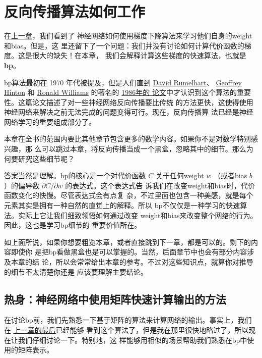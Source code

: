 
\chapter{反向传播算法如何工作}
\label{ch:HowTheBackpropagationAlgorithmWorks}

在\hyperref[ch:UsingNeuralNetsToRecognizeHandwrittenDigits]{上一章}，我们看到了
神经网络如何使用梯度下降算法来学习他们自身的\gls*{weight}和\gls*{bias}。但是，这
里还留下了一个问题：我们并没有讨论如何计算代价函数的梯度。这是很大的缺失！在本章，
我们会解释计算这些梯度的快速算法，也就是\textbf{\gls{bp}}。

\gls*{bp}算法最初在 1970 年代被提及，但是人们直到
\href{http://en.wikipedia.org/wiki/David_Rumelhart}{David Rumelhart}、
\href{http://www.cs.toronto.edu/~hinton/}{Geoffrey Hinton} 和
\href{http://en.wikipedia.org/wiki/Ronald_J._Williams}{Ronald Williams} 的著名的
\href{http://www.nature.com/nature/journal/v323/n6088/pdf/323533a0.pdf}{1986年的
  论文}中才认识到这个算法的重要性。这篇论文描述了对一些神经网络反向传播要比传统
的方法更快，这使得使用神经网络来解决之前无法完成的问题变得可行。现在，反向传播算
法已经是神经网络学习的重要组成部分了。

本章在全书的范围内要比其他章节包含更多的数学内容。如果你不是对数学特别感兴趣，那
么可以跳过本章，将反向传播当成一个黑盒，忽略其中的细节。那么为何要研究这些细节呢？

答案当然是理解。\gls*{bp}的核心是一个对代价函数 $C$ 关于任何\gls*{weight} $w$
（或者\gls*{bias} $b$ ）的偏导数 $\partial C/\partial w$ 的表达式。这个表达式告
诉我们在改变\gls*{weight}和\gls*{bias}时，代价函数变化的快慢。尽管表达式会有点复
杂，不过里面也包含一种美感，就是每个元素其实是拥有一种自然的直觉上的解释。所以%
\gls*{bp}不仅仅是一种学习的快速算法。实际上它让我们细致领悟如何通过改变%
\gls*{weight}和\gls*{bias}来改变整个网络的行为。因此，这也是学习\gls*{bp}细节的
重要价值所在。

如上面所说，如果你想要粗览本章，或者直接跳到下一章，都是可以的。剩下的内容即使你
是把\gls*{bp}看做黑盒也是可以掌握的。当然，后面章节中也会有部分内容涉及本章的结
论，所以会常常给出本章的参考。不过对这些知识点，就算你对推导的细节不太清楚你还是
应该要理解主要结论。

\section{热身：神经网络中使用矩阵快速计算输出的方法}
\label{sec:warm_up}

在讨论\gls*{bp}前，我们先熟悉一下基于矩阵的算法来计算网络的输出。事实上，我们在%
\hyperref[sec:implementing_our_network_to_classify_digits]{上一章的最后}已经能够
看到这个算法了，但是我在那里很快地略过了，所以现在让我们仔细讨论一下。特别地，这
样能够用相似的场景帮助我们熟悉在\gls*{bp}中使用的矩阵表示。

